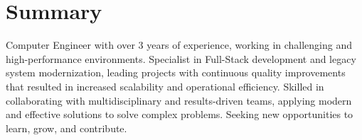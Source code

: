 \section{Summary}
	Computer Engineer with over 3 years of experience, working in challenging and high-performance environments. Specialist in Full-Stack development and legacy system modernization, leading projects with continuous quality improvements that resulted in increased scalability and operational efficiency. Skilled in collaborating with multidisciplinary and results-driven teams, applying modern and effective solutions to solve complex problems. Seeking new opportunities to learn, grow, and contribute.